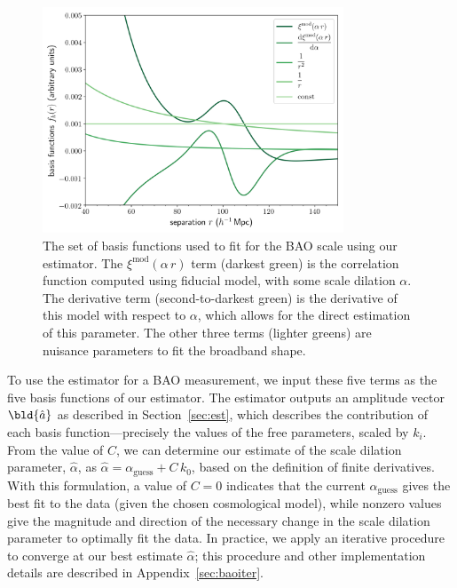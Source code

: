 \begin{figure}[t]
    \centering
    \includegraphics[width=0.8\textwidth]{bao_bases}
    \caption{The set of basis functions used to fit for the BAO scale using our estimator. The $\xi^\mathrm{mod}(\alpha\,r)$ term (darkest green) is the correlation function computed using fiducial model, with some scale dilation $\alpha$. The derivative term (second-to-darkest green) is the derivative of this model with respect to $\alpha$, which allows for the direct estimation of this parameter. The other three terms (lighter greens) are nuisance parameters to fit the broadband shape.}
    \label{fig:bao_bases}
\end{figure}

To use the estimator for a BAO measurement, we input these five terms as the five basis functions of our estimator.
The estimator outputs an amplitude vector $\bld{\hat a}$ as described in Section~\ref{sec:est}, which describes the contribution of each basis function---precisely the values of the free parameters, scaled by $k_i$.
From the value of $C$, we can determine our estimate of the scale dilation parameter, $\hat{\alpha}$, as $\hat{\alpha} = \alpha_\mathrm{guess} + C\,k_0$, based on the definition of finite derivatives. 
With this formulation, a value of $C=0$ indicates that the current $\alpha_\mathrm{guess}$ gives the best fit to the data (given the chosen cosmological model), while nonzero values give the magnitude and direction of the necessary change in the scale dilation parameter to optimally fit the data.
In practice, we apply an iterative procedure to converge at our best estimate $\hat{\alpha}$; this procedure and other implementation details are described in Appendix~\ref{sec:baoiter}.

